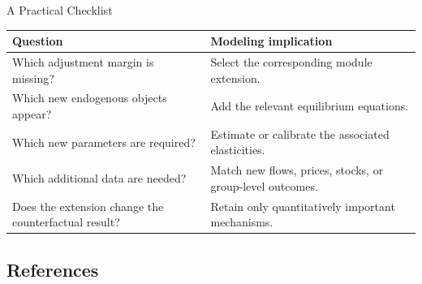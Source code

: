 \documentclass[aspectratio=169,11pt]{beamer}
\begin{document}
\begin{frame}{A Practical Checklist}
  \small
  \setlength{\tabcolsep}{5pt}
  \renewcommand{\arraystretch}{1.22}
  \begin{center}
  \begin{tabular}{
    >{\raggedright\arraybackslash}p{}
    >{\raggedright\arraybackslash}p{}}
    \toprule
    Question & Modeling implication \\
    \midrule
    Which adjustment margin is missing?
      & Select the corresponding module extension. \\
    \addlinespace[3pt]
    Which new endogenous objects appear?
      & Add the relevant equilibrium equations. \\
    \addlinespace[3pt]
    Which new parameters are required?
      & Estimate or calibrate the associated elasticities. \\
    \addlinespace[3pt]
    Which additional data are needed?
      & Match new flows, prices, stocks, or group-level outcomes. \\
    \addlinespace[3pt]
    Does the extension change the counterfactual result?
      & Retain only quantitatively important mechanisms. \\
    \bottomrule
  \end{tabular}
  \end{center}
\end{frame}

\subsection{References}
\end{document}
